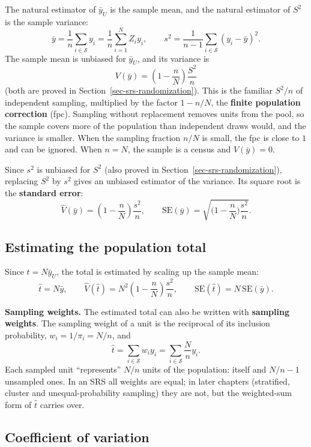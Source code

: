 \documentclass[
  letterpaper,
  DIV=11,
  numbers=noendperiod]{scrreprt}
\renewcommand{\[}{\begin{equation}}
\renewcommand{\]}{\end{equation}}
\begin{document}
The natural estimator of \(\bar y_U\) is the sample mean, and the
natural estimator of \(S^2\) is the sample variance: \[
\bar y = \frac1n \sum_{i \in \mathcal S} y_i = \frac1n \sum_{i=1}^N Z_i y_i,
\qquad
s^2 = \frac{1}{n-1}\sum_{i\in\mathcal S} (y_i - \bar y)^2 .
\] The sample mean is unbiased for \(\bar y_U\), and its variance is \[
V(\bar{y}) = \left(1 - \frac{n}{N}\right)\frac{S^2}{n}
\] (both are proved in Section~\ref{sec-srs-randomization}). This is the
familiar \(S^2/n\) of independent sampling, multiplied by the factor
\(1 - n/N\), the \textbf{finite population correction} (fpc). Sampling
without replacement removes units from the pool, so the sample covers
more of the population than independent draws would, and the variance is
smaller. When the sampling fraction \(n/N\) is small, the fpc is close
to \(1\) and can be ignored. When \(n = N\), the sample is a census and
\(V(\bar y) = 0\).

Since \(s^2\) is unbiased for \(S^2\) (also proved in
Section~\ref{sec-srs-randomization}), replacing \(S^2\) by \(s^2\) gives
an unbiased estimator of the variance. Its square root is the
\textbf{standard error}: \[
\boxed{
\hat{V}(\bar{y}) = \left(1 - \frac{n}{N}\right)\frac{s^2}{n}, \qquad
\mathrm{SE}(\bar y) = \sqrt{\Big(1-\frac nN\Big)\frac{s^2}{n}} .}
\]

\subsection{Estimating the population
total}\label{estimating-the-population-total}

Since \(t = N\bar y_U\), the total is estimated by scaling up the sample
mean: \[
\boxed{
\hat{t} = N\bar{y}, \qquad
\hat{V}(\hat{t}) = N^2\left(1 - \frac{n}{N}\right)\frac{s^2}{n}, \qquad
\mathrm{SE}(\hat{t}) = N\,\mathrm{SE}(\bar{y}).}
\]

\textbf{Sampling weights.} The estimated total can also be written with
\textbf{sampling weights}. The sampling weight of a unit is the
reciprocal of its inclusion probability, \(w_i = 1/\pi_i = N/n\), and \[
\hat t = \sum_{i\in\mathcal S} w_i y_i = \sum_{i\in\mathcal S} \frac{N}{n} y_i .
\] Each sampled unit ``represents'' \(N/n\) units of the population:
itself and \(N/n - 1\) unsampled ones. In an SRS all weights are equal;
in later chapters (stratified, cluster and unequal-probability sampling)
they are not, but the weighted-sum form of \(\hat t\) carries over.

\subsection{Coefficient of variation}\label{coefficient-of-variation}
\end{document}
